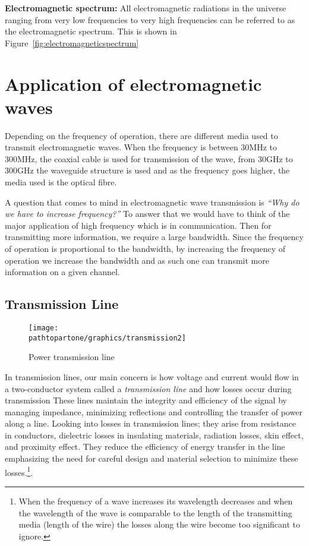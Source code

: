 \textbf{Electromagnetic spectrum:} All electromagnetic radiations in the universe ranging from very low frequencies to very high frequencies can be referred to as the electromagnetic spectrum. This is shown in Figure~\ref{fig:electromagneticspectrum}

\section{Application of electromagnetic waves}
Depending on the frequency of operation, there are different media used to transmit electromagnetic waves. When the frequency is between 30MHz to 300MHz, the coaxial cable is used for transmission of the wave, from 30GHz to 300GHz the waveguide structure is used and as the frequency goes higher, the media used is the optical fibre.

A question that comes to mind in electromagnetic wave transmission is \emph{\textquotedblleft Why do we have to increase frequency?\textquotedblright} \hspace{0.03in} To answer that we would have to think of the major application of high frequency which is in communication. Then for transmitting more information, we require a large bandwidth. Since the frequency of operation is proportional to the bandwidth, by increasing the frequency of operation we increase the bandwidth and as such one can transmit more information on a given channel.

\subsection{Transmission Line}
\begin{figure}[h]
\centering
\texttt{[image: \\pathtopartone/graphics/transmission2]}
\caption{Power transmission line}
\end{figure}

In transmission lines, our main concern is how voltage and current would flow in a two-conductor system called a \textit{transmission line} and how losses occur during transmission These lines maintain the integrity and efficiency of the signal by managing impedance, minimizing reflections and controlling the transfer of power along a line. Looking into losses in transmission lines; they arise from resistance in conductors, dielectric losses in insulating materials, radiation losses, skin effect, and proximity effect. They reduce the efficiency of energy transfer in the line emphasizing the need for careful design and material selection to minimize these losses.\footnote{
When the frequency of a wave increases its wavelength decreases and when the wavelength of the wave is comparable to the length of the transmitting media (length of the wire) the losses along the wire become too significant to ignore.
}.

